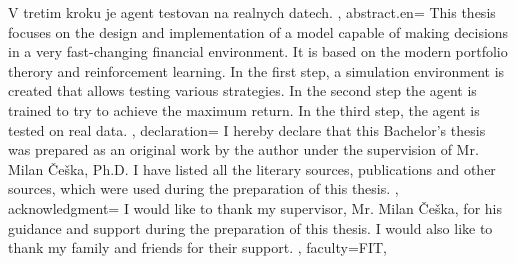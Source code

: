 {{        V tretim kroku je agent testovan na realnych datech.
    }, %
    abstract.en={
        This thesis focuses on the design and implementation of a model capable of
        making decisions in a very fast-changing financial environment. It is based on the
        modern portfolio therory and reinforcement learning.
        In the first step, a simulation environment is created
        that allows testing various strategies. In the second step
        the agent is trained to try to achieve the maximum return.
        In the third step, the agent is tested on real data.
    }, %
    declaration={
        I hereby declare that this Bachelor's thesis was prepared as an original work by the author under
        the supervision of Mr. Milan Češka, Ph.D. %
        I have listed all the literary sources, publications and other sources, which were used during the preparation of this thesis.
    },
%
    acknowledgment={
        I would like to thank my supervisor, Mr. Milan Češka, for his guidance and support during the preparation of this thesis.
        I would also like to thank my family and friends for their support.
    },
%
%        
%
    faculty={FIT}, %
}
